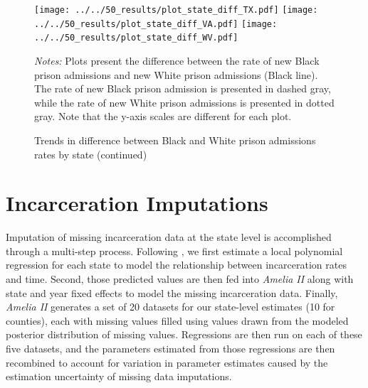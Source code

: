 \documentclass[12pt]{article}
\begin{document}
 \newpage
 \begin{figure}[h!]
 	\begin{center}
 	\caption{Trends in difference between Black and White prison admissions rates by state (continued)}
 	\small

 		\vspace{.2in}
 			\texttt{[image: ../../50\_results/plot\_state\_diff\_TX.pdf]}
 			\texttt{[image: ../../50\_results/plot\_state\_diff\_VA.pdf]}
       \texttt{[image: ../../50\_results/plot\_state\_diff\_WV.pdf]} \\
       \smallskip\smallskip\smallskip
 	\label{figure_difference_states2}
 	\end{center}
   {\scriptsize{\emph{Notes:} Plots present the difference between the rate of new Black prison admissions and new White prison admissions (Black line).  The rate of new Black prison admission is presented in dashed gray, while the rate of new White prison admissions is presented in dotted gray.  Note that the y-axis scales are different for each plot.}}
 \end{figure} \normalsize




 \clearpage \newpage
 \section{Incarceration Imputations}\label{appendix_imputations}
 \setcounter{table}{0}
 \setcounter{figure}{0}
 \renewcommand{\thetable}{E\arabic{table}}
 \renewcommand{\thefigure}{E\arabic{figure}}
 \normalsize

 Imputation of missing incarceration data at the state level is accomplished through a multi-step process. Following , we first estimate a local polynomial regression for each state to model the relationship between incarceration rates and time. Second, those predicted values are then fed into \emph{Amelia II}  along with state and year fixed effects to model the missing incarceration data. Finally, \emph{Amelia II} generates a set of 20 datasets for our state-level estimates (10 for counties), each with missing values filled using values drawn from the modeled posterior distribution of missing values. Regressions are then run on each of these five datasets, and the parameters estimated from those regressions are then recombined to account for variation in parameter estimates caused by the estimation uncertainty of missing data imputations.
\end{document}
